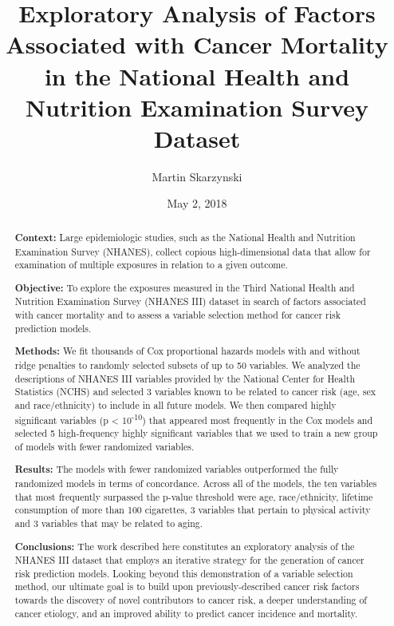 \documentclass[12pt,oneside]{reedthesis}
\title{Exploratory Analysis of Factors Associated with Cancer Mortality\\
in the National Health and Nutrition Examination Survey Dataset}
\author{Martin Skarzynski}
\date{May 2, 2018}
\theoremstyle{definition}
\theoremstyle{definition}
\theoremstyle{definition}
\theoremstyle{remark}
\begin{document}
  \maketitle

\frontmatter %
\pagestyle{empty} %





  \begin{abstract}
    \textbf{Context:} Large epidemiologic studies, such as the National
    Health and Nutrition Examination Survey (NHANES), collect copious
    high-dimensional data that allow for examination of multiple exposures
    in relation to a given outcome.
    
    \textbf{Objective:} To explore the exposures measured in the Third
    National Health and Nutrition Examination Survey (NHANES III) dataset in
    search of factors associated with cancer mortality and to assess a
    variable selection method for cancer risk prediction models.
    
    \textbf{Methods:} We fit thousands of Cox proportional hazards models
    with and without ridge penalties to randomly selected subsets of up to
    50 variables. We analyzed the descriptions of NHANES III variables
    provided by the National Center for Health Statistics (NCHS) and
    selected 3 variables known to be related to cancer risk (age, sex and
    race/ethnicity) to include in all future models. We then compared highly
    significant variables (p \textless{} 10\textsuperscript{-10}) that
    appeared most frequently in the Cox models and selected 5 high-frequency
    highly significant variables that we used to train a new group of models
    with fewer randomized variables.
    
    \textbf{Results:} The models with fewer randomized variables
    outperformed the fully randomized models in terms of concordance. Across
    all of the models, the ten variables that most frequently surpassed the
    p-value threshold were age, race/ethnicity, lifetime consumption of more
    than 100 cigarettes, 3 variables that pertain to physical activity and 3
    variables that may be related to aging.
    
    \textbf{Conclusions:} The work described here constitutes an exploratory
    analysis of the NHANES III dataset that employs an iterative strategy
    for the generation of cancer risk prediction models. Looking beyond this
    demonstration of a variable selection method, our ultimate goal is to
    build upon previously-described cancer risk factors towards the
    discovery of novel contributors to cancer risk, a deeper understanding
    of cancer etiology, and an improved ability to predict cancer incidence
    and mortality.
  \end{abstract}
\end{document}

